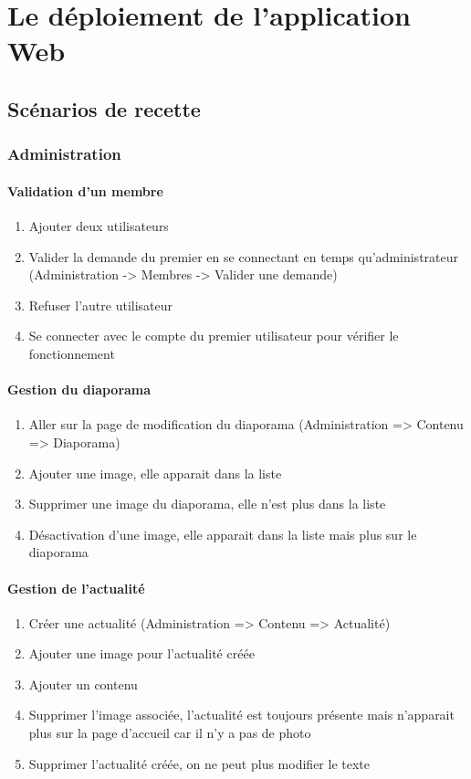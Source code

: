 \documentclass[11pt]{report}
\begin{document}
 

\chapter{Le déploiement de l'application Web}
\section{Scénarios de recette}
\subsection{Administration}
\subsubsection*{Validation d'un membre}
\begin{enumerate}
\item Ajouter deux utilisateurs
\item Valider la demande du premier en se connectant en temps qu'administrateur (Administration -> Membres -> Valider une demande)
\item Refuser l’autre utilisateur
\item Se connecter avec le compte du premier utilisateur pour vérifier le fonctionnement
\end{enumerate}
\subsubsection*{Gestion du diaporama}
\begin{enumerate}
\item Aller sur la page de modification du diaporama (Administration => Contenu => Diaporama)
\item Ajouter une image, elle apparait dans la liste
\item Supprimer une image du diaporama, elle n'est plus dans la liste
\item Désactivation d’une image, elle apparait dans la liste mais plus sur le diaporama
\end{enumerate}
\subsubsection*{Gestion de l'actualité}
\begin{enumerate}
\item Créer une actualité (Administration => Contenu => Actualité)
\item Ajouter une image pour l’actualité créée
\item Ajouter un contenu
\item Supprimer l’image associée, l'actualité est toujours présente mais n'apparait plus sur la page d'accueil car il n'y a pas de photo
\item Supprimer l’actualité créée, on ne peut plus modifier le texte
\end{enumerate}
\end{document}
